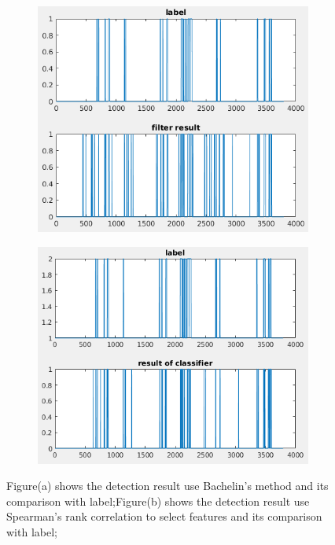 \documentclass[article]{article}
\begin{document}
    \begin{figure}
    \begin{center}
    	
    	\begin{subfigure}[b]{0.45\textwidth}
    		\centering
    		\includegraphics[width=\textwidth]{method1}
    		\caption{}
    	
    	\end{subfigure}
    	\hfill
    	\begin{subfigure}[b]{0.45\textwidth}
    		\centering
    		\includegraphics[width=\textwidth]{method2}
    		\caption{}
    		
    	\end{subfigure}
    	   	
    	\caption{Figure(a) shows the detection result use Bachelin's method and its comparison with label;Figure(b) shows the detection result use Spearman's rank correlation to select features and its comparison with label;}
    	\label{result}
 \end{center}	
   
 \end{figure}
    
\end{document}
